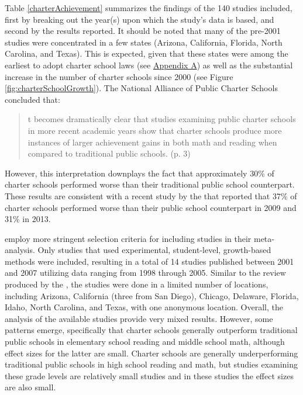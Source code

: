 \documentclass[letterpaper,12pt]{article} %
\renewcommand{\normalsize}{\fontsize{12}{13}\selectfont}
\begin{document}
Table \ref{charterAchievement} summarizes the findings of the 140 studies included, first by breaking out the year(s) upon which the study's data is based, and second by the results reported. It should be noted that many of the pre-2001 studies were concentrated in a few states (Arizona, California, Florida, North Carolina, and Texas). This is expected, given that these states were among the earliest to adopt charter school laws (see \hyperref[appendixA]{Appendix A}) as well as the substantial increase in the number of charter schools since 2000 (see Figure \ref{fig:charterSchoolGrowth}). The National Alliance of Public Charter Schools concluded that:

\begin{quote} \normalsize
[I]t becomes dramatically clear that studies examining public charter schools in more recent academic years show that charter schools produce more instances of larger achievement gains in both math and reading when compared to traditional public schools. (p. 3)
\end{quote}

\noindent However, this interpretation downplays the fact that approximately 30\% of charter schools performed worse than their traditional public school counterpart. These results are consistent with a recent study by the  that reported that 37\% of charter schools performed worse than their public school counterpart in 2009 and 31\% in 2013.



 employ more stringent selection criteria for including studies in their meta-analysis. Only studies that used experimental, student-level, growth-based methods were included, resulting in a total of 14 studies published between 2001 and 2007 utilizing data ranging from 1998 through 2005. Similar to the review produced by the , the studies were done in a limited number of locations, including Arizona, California (three from San Diego), Chicago, Delaware, Florida, Idaho, North Carolina, and Texas, with one anonymous location. Overall, the analysis of the available studies provide very mixed results. However, some patterns emerge, specifically that charter schools generally outperform traditional public schools in elementary school reading and middle school math, although effect sizes for the latter are small. Charter schools are generally underperforming traditional public schools in high school reading and math, but studies examining these grade levels are relatively small studies \cite<see also,>{whatweknow} and in these studies the effect sizes are also small.
\end{document}
